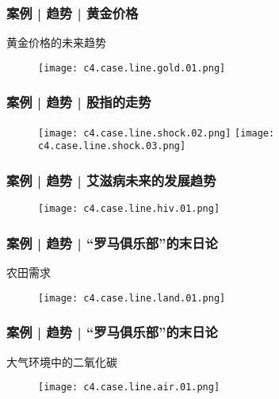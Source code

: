 \begin{frame}
  \frametitle{案例 | 趋势 | 黄金价格}
  \begin{block}{黄金价格的未来趋势}
    \begin{figure}
      \centering
      \texttt{[image: c4.case.line.gold.01.png]}
    \end{figure}
  \end{block}
\end{frame}

\begin{frame}
  \frametitle{案例 | 趋势 | 股指的走势}
  \begin{figure}
    \centering
    \texttt{[image: c4.case.line.shock.02.png]}\quad
    \texttt{[image: c4.case.line.shock.03.png]}
  \end{figure}
\end{frame}

\begin{frame}
  \frametitle{案例 | 趋势 | 艾滋病未来的发展趋势}
  \begin{figure}
    \centering
    \texttt{[image: c4.case.line.hiv.01.png]}
  \end{figure}
\end{frame}

\begin{frame}
  \frametitle{案例 | 趋势 | “罗马俱乐部”的末日论}
  \begin{block}{农田需求}
    \begin{figure}
      \centering
      \texttt{[image: c4.case.line.land.01.png]}
    \end{figure}
  \end{block}
\end{frame}

\begin{frame}
  \frametitle{案例 | 趋势 | “罗马俱乐部”的末日论}
  \begin{block}{大气环境中的二氧化碳}
    \begin{figure}
      \centering
      \texttt{[image: c4.case.line.air.01.png]}
    \end{figure}
  \end{block}
\end{frame}

